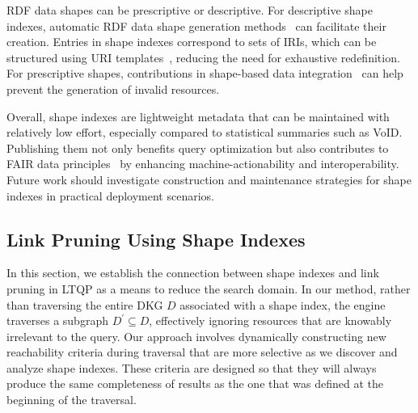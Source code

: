 RDF data shapes can be prescriptive or descriptive.
For descriptive shape indexes, automatic RDF data shape generation methods~\cite{fernandez2023extracting} can facilitate their creation. 
Entries in shape indexes correspond to sets of IRIs, which can be structured using URI templates~\cite{ietf6570Template}, reducing the need for exhaustive redefinition. 
For prescriptive shapes, contributions in shape-based data integration~\cite{LabraGayo2023} can help prevent the generation of invalid resources.

Overall, shape indexes are lightweight metadata that can be maintained with relatively low effort, especially compared to statistical summaries such as VoID.
Publishing them not only benefits query optimization but also contributes to FAIR data principles~\cite{Wilkinson2016} by enhancing machine-actionability and interoperability.
Future work should investigate construction and maintenance strategies for shape indexes in practical deployment scenarios.

\subsection{Link Pruning Using Shape Indexes}\label{sec:sourceSelection}

In this section, we establish the connection between shape indexes and link pruning in LTQP as a means to reduce the search domain.
In our method, rather than traversing the entire DKG $D$ associated with a shape index, the engine traverses a subgraph $D^{\prime} \subseteq D$, effectively ignoring resources that are knowably irrelevant to the query.
Our approach involves dynamically constructing new reachability criteria during traversal that are more selective as we discover and analyze shape indexes.
These criteria are designed so that they will always produce the same completeness of results as the one that was defined at the beginning of the traversal.

